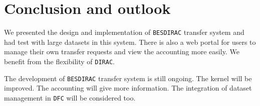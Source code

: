 \section{Conclusion and outlook}
We presented the design and implementation of {\tt BESDIRAC} transfer system
and had test with large datasets in this system.
There is also a web portal for users to manage their own transfer requests
and view the accounting more easily.
We benefit from the flexibility of {\tt DIRAC}.

The development of {\tt BESDIRAC} transfer system is still ongoing.
The kernel will be improved.
The accounting will give more information.
The integration of dataset management in {\tt DFC} will be considered too.
